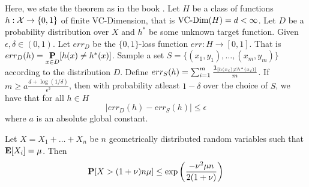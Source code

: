 \begin{theorem} 
\label{thm:uniformConvergence}
Here, we state the theorem as in the book \cite{shalev2014understanding}. Let $H$ be a class of functions $h:\mathcal X \rightarrow \{0, 1\}$ of finite VC-Dimension, that is $\operatorname{VC-Dim}(H) = d < \infty$. Let $D$ be a probability distribution over $X$ and $h^*$ be some unknown target function. Given $\epsilon, \delta \in (0, 1)$. Let $err_D$ be the $\{0, 1\}$-loss function $err: H \rightarrow [0, 1]$. That is $err_D(h) = \underset{x \in D}{\mathbf P}[h(x) \neq h^*(x)]$. Sample a set $S = \{(x_1, y_1), \ldots, (x_m, y_m)\}$ according to the distribution $D$. Define $err_S(h) = \sum_{i=1}^{m} \frac{\mathbf 1_{[h(x_i) \neq h^*(x_i)]}}{m}$. If $m \ge a\frac{d + \log (1/\delta)}{\epsilon^2}$, then with probability atleast $1-\delta$ over the choice of $S$, we have that for all $h \in H$
$$|err_D(h) - err_S(h)| \le \epsilon$$
where $a$ is an absolute global constant. 
\end{theorem}

\begin{theorem}
\label{thm:geometricRV}
Let $X = X_1 + \ldots + X_n$ be $n$ geometrically distributed random variables such that $\mathbf E[X_i] = \mu$. Then 
$$\mathbf P[X > (1+\nu)n\mu] \le \exp\bigg(\frac{-\nu^2\mu n}{2(1+\nu)}\bigg)$$
\end{theorem} 